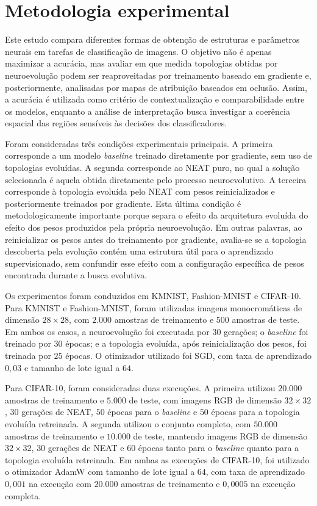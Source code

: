 \section{Metodologia experimental}
\label{sec:metodologia_experimental}

Este estudo compara diferentes formas de obtenção de estruturas e parâmetros neurais em tarefas de classificação de imagens. O objetivo não é apenas maximizar a acurácia, mas avaliar em que medida topologias obtidas por neuroevolução podem ser reaproveitadas por treinamento baseado em gradiente e, posteriormente, analisadas por mapas de atribuição baseados em oclusão. Assim, a acurácia é utilizada como critério de contextualização e comparabilidade entre os modelos, enquanto a análise de interpretação busca investigar a coerência espacial das regiões sensíveis às decisões dos classificadores.

Foram consideradas três condições experimentais principais. A primeira corresponde a um modelo \textit{baseline} treinado diretamente por gradiente, sem uso de topologias evoluídas. A segunda corresponde ao NEAT puro, no qual a solução selecionada é aquela obtida diretamente pelo processo neuroevolutivo. A terceira corresponde à topologia evoluída pelo NEAT com pesos reinicializados e posteriormente treinados por gradiente. Esta última condição é metodologicamente importante porque separa o efeito da arquitetura evoluída do efeito dos pesos produzidos pela própria neuroevolução. Em outras palavras, ao reinicializar os pesos antes do treinamento por gradiente, avalia-se se a topologia descoberta pela evolução contém uma estrutura útil para o aprendizado supervisionado, sem confundir esse efeito com a configuração específica de pesos encontrada durante a busca evolutiva.

Os experimentos foram conduzidos em KMNIST, Fashion-MNIST e CIFAR-10. Para KMNIST e Fashion-MNIST, foram utilizadas imagens monocromáticas de dimensão $28 \times 28$, com $2.000$ amostras de treinamento e $500$ amostras de teste. Em ambos os casos, a neuroevolução foi executada por $30$ gerações; o \textit{baseline} foi treinado por $30$ épocas; e a topologia evoluída, após reinicialização dos pesos, foi treinada por $25$ épocas. O otimizador utilizado foi SGD, com taxa de aprendizado $0{,}03$ e tamanho de lote igual a $64$.

Para CIFAR-10, foram consideradas duas execuções. A primeira utilizou $20.000$ amostras de treinamento e $5.000$ de teste, com imagens RGB de dimensão $32 \times 32$, $30$ gerações de NEAT, $50$ épocas para o \textit{baseline} e $50$ épocas para a topologia evoluída retreinada. A segunda utilizou o conjunto completo, com $50.000$ amostras de treinamento e $10.000$ de teste, mantendo imagens RGB de dimensão $32 \times 32$, $30$ gerações de NEAT e $60$ épocas tanto para o \textit{baseline} quanto para a topologia evoluída retreinada. Em ambas as execuções de CIFAR-10, foi utilizado o otimizador AdamW com tamanho de lote igual a $64$, com taxa de aprendizado $0{,}001$ na execução com $20.000$ amostras de treinamento e $0{,}0005$ na execução completa.

